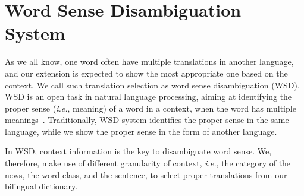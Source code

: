 \section{Word Sense Disambiguation System}
\label{sec:wsd}
\begin{CJK}{UTF8}{gbsn}
As we all know, one word often have multiple translations in another language, and our extension is expected to show the most appropriate one based on the context. We call such translation selection as word sense disambiguation (WSD). WSD is an open task in natural language processing, aiming at identifying the proper sense ({\it i.e.}, meaning) of a word  in a context, when the word has multiple meanings~\cite{Navigli2009}. Traditionally, WSD system identifies the proper sense in the same language, while we show the proper sense in the form of another language.

In WSD, context information is the key to disambiguate word sense. We, therefore, make use of different granularity of context, {\it i.e.}, the category of the news, the word class, and the sentence, to select proper translations from our bilingual dictionary.


                                                         

\end{CJK}
